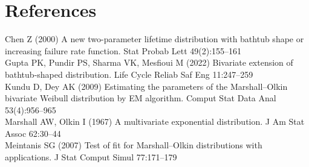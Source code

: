 \documentclass[11pt,a4paper]{article}
\begin{document}
\section{References}
\noindent Chen Z (2000) A new two-parameter lifetime distribution with
bathtub shape or increasing failure rate function. Stat Probab Lett
49(2):155--161\\[0.35em]
\noindent Gupta PK, Pundir PS, Sharma VK, Mesfioui M (2022) Bivariate
extension of bathtub-shaped distribution. Life Cycle Reliab Saf Eng
11:247--259\\[0.35em]
\noindent Kundu D, Dey AK (2009) Estimating the parameters of the
Marshall--Olkin bivariate Weibull distribution by EM algorithm. Comput
Stat Data Anal 53(4):956--965\\[0.35em]
\noindent Marshall AW, Olkin I (1967) A multivariate exponential
distribution. J Am Stat Assoc 62:30--44\\[0.35em]
\noindent Meintanis SG (2007) Test of fit for Marshall--Olkin
distributions with applications. J Stat Comput Simul 77:171--179
\end{document}
